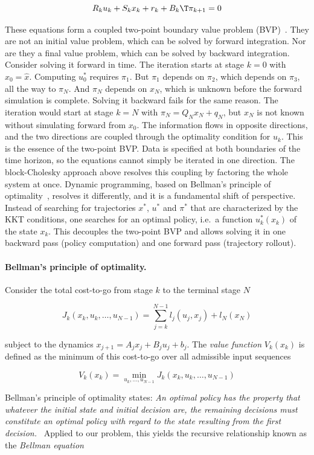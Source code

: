 \[
R_k u_k + S_k x_k + r_k + B_k\T \pi_{k+1} = 0
\]

These equations form a coupled two-point boundary value problem (BVP)~\cite{bryson1975applied}.
They are not an initial value problem, which can be solved by forward integration.
Nor are they a final value problem, which can be solved by backward integration.
Consider solving it forward in time.
The iteration starts at stage $k=0$ with $x_0 = \hat{x}$.
Computing $u_0^*$ requires $\pi_1$.
But $\pi_1$ depends on $\pi_2$, which depends on $\pi_3$, all the way to $\pi_N$.
And $\pi_N$ depends on $x_N$, which is unknown before the forward simulation is complete.
Solving it backward fails for the same reason.
The iteration would start at stage $k=N$ with $\pi_N = Q_N x_N + q_N$, but $x_N$ is not known without simulating forward from $x_0$.
The information flows in opposite directions, and the two directions are coupled through the optimality condition for $u_k$.
This is the essence of the two-point BVP.
Data is specified at both boundaries of the time horizon, so the equations cannot simply be iterated in one direction.
The block-Cholesky approach above resolves this coupling by factoring the whole system at once.
Dynamic programming, based on Bellman's principle of optimality~\cite{bellman1957dynamic}, resolves it differently, and it is a fundamental shift of perspective.
Instead of searching for trajectories $x^*$, $u^*$ and $\pi^*$ that are characterized by the KKT conditions,
one searches for an optimal policy, i.e.\ a function $u_k^*(x_k)$ of the state $x_k$.
This decouples the two-point BVP and allows solving it in one backward pass (policy computation) and one forward pass (trajectory rollout).

\paragraph{Bellman's principle of optimality.}
Consider the total cost-to-go from stage $k$ to the terminal stage $N$

\[
J_k(x_k, u_k, \ldots, u_{N-1}) = \sum_{j=k}^{N-1} l_j(u_j, x_j) + l_N(x_N)
\]

subject to the dynamics $x_{j+1} = A_j x_j + B_j u_j + b_j$.
The \textit{value function} $V_k(x_k)$ is defined as the minimum of this cost-to-go over all admissible input sequences

\[
V_k(x_k) = \min_{u_k, \ldots, u_{N-1}} J_k(x_k, u_k, \ldots, u_{N-1})
\]

Bellman's principle of optimality states:
\textit{An optimal policy has the property that whatever the initial state and initial decision are, the remaining decisions must constitute an optimal policy with regard to the state resulting from the first decision.}~\cite[p.~83]{bellman1957dynamic}
Applied to our problem, this yields the recursive relationship known as the \textit{Bellman equation}~\cite{bertsekas1995dynamic}

